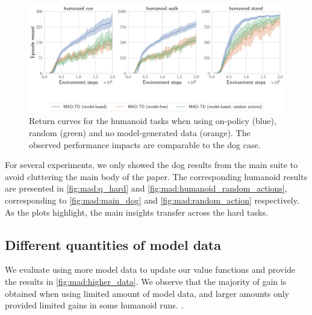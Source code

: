 \begin{figure}[H]
    \centering
    \includegraphics[width=0.9\linewidth]{figures/mad-td/humanoid_random_actions.pdf}
    \caption{Return curves for the humanoid tasks when using on-policy (blue), random (green) and no model-generated data (orange). The observed performance impacts are comparable to the dog case.}
    \label{fig:mad:humanoid_random_actions}
\end{figure}

For several experiments, we only showed the dog results from the main suite to avoid cluttering the main body of the paper.
The corresponding humanoid results are presented in \autoref{fig:mad:q_hard} and \autoref{fig:mad:humanoid_random_actions}, corresponding to \autoref{fig:mad:main_dog} and \autoref{fig:mad:random_action} respectively.
As the plots highlight, the main insights transfer across the hard tasks.


\subsection{Different quantities of model data}
\label{app:model_data}

We evaluate using more model data to update our value functions and provide the results in \autoref{fig:mad:higher_data}.
We observe that the majority of gain is obtained when using limited amount of model data, and larger amounts only provided limited gains in some humanoid runs.
.

